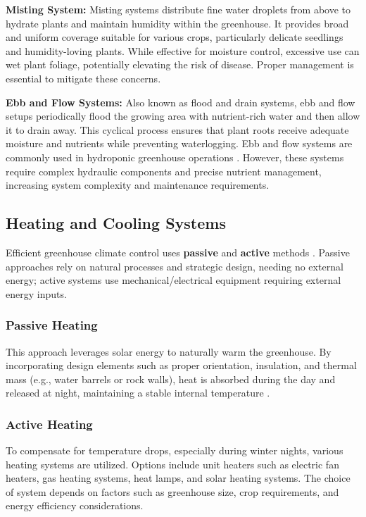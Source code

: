 \textbf{Misting System:} Misting systems distribute fine water droplets from above to hydrate plants and maintain humidity within the greenhouse. It provides broad and uniform coverage suitable for various crops, particularly delicate seedlings and humidity-loving plants. While effective for moisture control, excessive use can wet plant foliage, potentially elevating the risk of disease. Proper management is essential to mitigate these concerns.

\textbf{Ebb and Flow Systems:} Also known as flood and drain systems, ebb and flow setups periodically flood the growing area with nutrient-rich water and then allow it to drain away. This cyclical process ensures that plant roots receive adequate moisture and nutrients while preventing waterlogging. Ebb and flow systems are commonly used in hydroponic greenhouse operations \citep{floraflex_irrigation}. However, these systems require complex hydraulic components and precise nutrient management, increasing system complexity and maintenance requirements.

\subsection{Heating and Cooling Systems} \label{heat}

Efficient greenhouse climate control uses \textbf{passive} and \textbf{active} methods \citep{vegtech_netafim}. Passive approaches rely on natural processes and strategic design, needing no external energy; active systems use mechanical/electrical equipment requiring external energy inputs. 

\subsubsection*{Passive Heating}
This approach leverages solar energy to naturally warm the greenhouse. By incorporating design elements such as proper orientation, insulation, and thermal mass (e.g., water barrels or rock walls), heat is absorbed during the day and released at night, maintaining a stable internal temperature \citep{kumari2007}.

\subsubsection*{Active Heating}
To compensate for temperature drops, especially during winter nights, various heating systems are utilized. Options include unit heaters such as electric fan heaters, gas heating systems, heat lamps, and solar heating systems. The choice of system depends on factors such as greenhouse size, crop requirements, and energy efficiency considerations.

